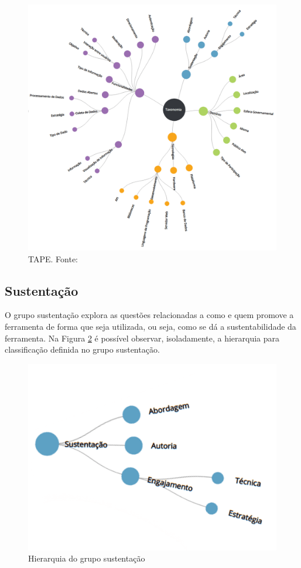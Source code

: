 \begin{figure}[!ht]
    \centering
    \includegraphics[scale=0.30]{./figuras/taxonopart-radial.png}
    \caption{TAPE. Fonte: }
    \label{fig:taxonomia-vispublica}
\end{figure}

\subsection{Sustentação}
\label{subsubsec:sustentacao}
O grupo sustentação explora as questões relacionadas a como e quem promove a ferramenta de forma que seja utilizada, ou seja, como se dá a sustentabilidade da ferramenta. 
Na Figura \ref{fig:grupo-sustentacao} é possível observar, isoladamente, a hierarquia para classificação definida no grupo sustentação.

\begin{figure}[!ht]
    \centering
    \includegraphics[scale=0.20]{./figuras/sustentacao.png}
    \caption{Hierarquia do grupo sustentação}
    \label{fig:grupo-sustentacao}
\end{figure}

